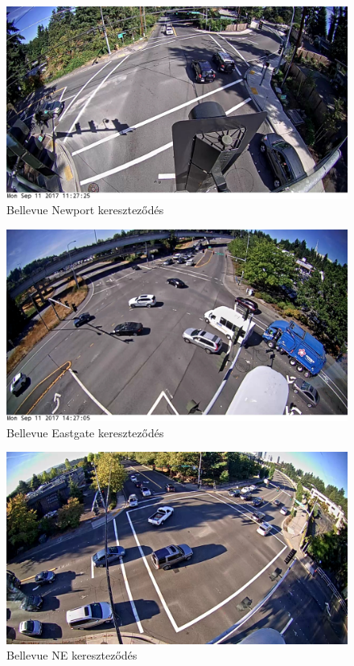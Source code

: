 \documentclass[acmtog, authorversion]{acmart}
\begin{document}
\begin{figure}
    \includegraphics[width=1\columnwidth]{dataset_samples/Bellevue_150th_Newport.JPG}
    \caption{Bellevue Newport kereszteződés}
    \label{fig: BellevueNewport}
\end{figure}
\begin{figure}
    \includegraphics[width=1\columnwidth]{dataset_samples/Bellevue_150th_Eastgate.JPG}
    \caption{Bellevue Eastgate kereszteződés}
    \label{fig: BellevueEastgate}
\end{figure}
\begin{figure}
    \includegraphics[width=1\columnwidth]{dataset_samples/Bellevue_116th_NE12th.JPG}
    \caption{Bellevue NE kereszteződés}
    \label{fig: BellevueNE}
\end{figure}
\end{document}
